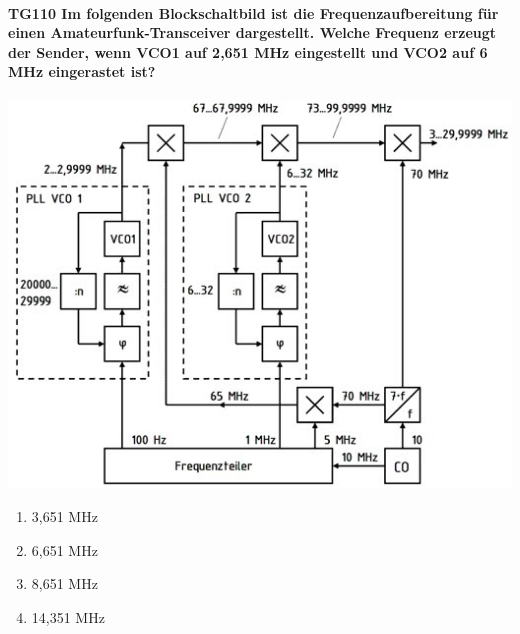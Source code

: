 \documentclass[8pt]{article}
\begin{document}
\paragraph*{TG110 Im folgenden Blockschaltbild ist die Frequenzaufbereitung für einen Amateurfunk-Transceiver dargestellt. Welche Frequenz erzeugt der Sender, wenn VCO1 auf 2,651 MHz eingestellt und VCO2 auf 6 MHz eingerastet ist?}
\begin{center}
	\begin{minipage}{\linewidth}
		\centering
		\includegraphics[scale=1.0]{pics/tg110_a.jpg}
	\end{minipage}
\end{center}
\begin{enumerate}[nolistsep,label=\Alph*]
\item 3,651 MHz
\item 6,651 MHz
\item 8,651 MHz
\item 14,351 MHz
\end{enumerate}
\end{document}
